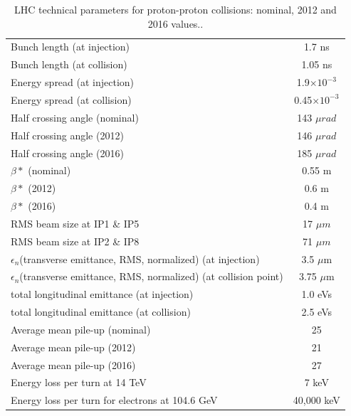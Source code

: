 \begin{table}
{\begin{tabular}[!htbp]{l c}
\hline
Bunch length (at injection)   &   1.7 ns \\
Bunch length (at collision)   &   1.05 ns \\
Energy spread (at injection)   &   1.9$\times 10^{-3}$ \\
Energy spread (at collision)   &   0.45$\times 10^{-3}$  \\
\hline
Half crossing angle  (nominal)   & 143 $\mu rad$ \\
Half crossing angle  (2012)   & 146 $\mu rad$ \\
Half crossing angle  (2016)   & 185 $\mu rad$ \\
\hline
$\beta *$  (nominal) &   0.55 m\\
$\beta *$   (2012)&   0.6 m\\
$\beta *$   (2016)&   0.4 m\\
\hline
RMS beam size at IP1 \& IP5 &   17 $\mu m$ \\
RMS beam size at IP2 \& IP8 &   71 $\mu m$ \\
\hline
$\epsilon_n$(transverse emittance, RMS, normalized) (at injection) &   3.5 $\mu$m\\
$\epsilon_n$(transverse emittance, RMS, normalized) (at collision point) &   3.75 $\mu$m\\
\hline
total longitudinal emittance (at injection) & 1.0 eVs \\
total longitudinal emittance (at collision) & 2.5 eVs \\
\hline
Average mean pile-up (nominal) &   25 \\
Average mean pile-up (2012) &    21 \\
Average mean pile-up (2016) &    27 \\
\hline
Energy loss per turn at 14 TeV              &   7 keV   \\
Energy loss per turn for electrons at 104.6 GeV          &  40,000 keV     \\
\hline
\end{tabular}
\caption{LHC technical parameters for proton-proton collisions: nominal, 2012 and 2016 values.\cite{Bruce2016, Schoerner-Sadenius2015, LHC-parameters-2016, LHC-tdr-vol1, cms-lumi-public-results}.}
\label{table:LHC-parameters}
}
\end{table}

